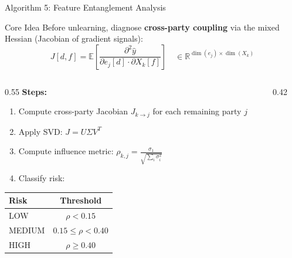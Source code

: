 \documentclass[aspectratio=169, 11pt]{beamer}
\begin{document}
\begin{frame}{Algorithm 5: Feature Entanglement Analysis}
  \begin{block}{Core Idea}
    Before unlearning, diagnose \textbf{cross-party coupling} via the mixed Hessian (Jacobian of gradient signals):
    \[
    J[d, f] = \mathbb{E}\!\left[\frac{\partial^2 \hat{y}}{\partial e_j[d] \cdot \partial X_k[f]}\right]
    \quad \in \mathbb{R}^{\dim(e_j) \times \dim(X_k)}
    \]
  \end{block}
  \begin{columns}[T]
    \begin{column}{0.55\textwidth}
      \textbf{Steps:}
      \begin{enumerate}
        \item Compute cross-party Jacobian $J_{k \to j}$ for each remaining party $j$
        \item Apply SVD: $J = U\Sigma V^T$
        \item Compute influence metric:
        $\displaystyle \rho_{k,j} = \frac{\sigma_1}{\sqrt{\sum_i \sigma_i^2}}$
        \item Classify risk:
      \end{enumerate}
      \vspace{0.1cm}
      \centering
      \renewcommand{\arraystretch}{1.2}
      \begin{tabular}{>{\footnotesize}l >{\footnotesize}c}
        \toprule
        \textbf{Risk} & \textbf{Threshold} \\
        \midrule
        \rowcolor{softgreen!15} LOW & $\rho < 0.15$ \\
        \rowcolor{amber!15} MEDIUM & $0.15 \leq \rho < 0.40$ \\
        \rowcolor{accentred!15} HIGH & $\rho \geq 0.40$ \\
        \bottomrule
      \end{tabular}
    \end{column}
    \begin{column}{0.42\textwidth}
      \begin{center}
\end{center}
\end{column}
\end{columns}
\end{frame}
\end{document}
